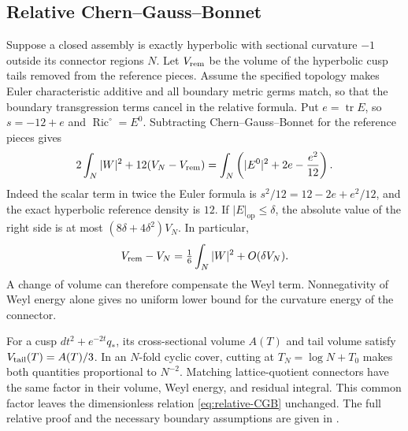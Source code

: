 \documentclass[11pt,a4paper]{article}
\theoremstyle{definition}\newtheorem{definition}[theorem]{Definition}
\theoremstyle{remark}\newtheorem{remark}[theorem]{Remark}
\DeclareMathOperator{\Ric}{Ric}
\DeclareMathOperator{\tr}{tr}
\newcommand{\op}{\mathrm{op}}
\newcommand{\Riczero}{\Ric^{\circ}}
\begin{document}
\subsection{Relative Chern--Gauss--Bonnet}
Suppose a closed assembly is exactly hyperbolic with sectional curvature $-1$ outside its connector regions $N$. Let $V_{\rm rem}$ be the volume of the hyperbolic cusp tails removed from the reference pieces. Assume the specified topology makes Euler characteristic additive and all boundary metric germs match, so that the boundary transgression terms cancel in the relative formula. Put $e=\tr E$, so $s=-12+e$ and $\Riczero=E^0$. Subtracting Chern--Gauss--Bonnet for the reference pieces gives
\begin{equation}\label{eq:relative-CGB}
 2\int_N|W|^2+12(V_N-V_{\rm rem})
 =\int_N\left(|E^0|^2+2e-\frac{e^2}{12}\right).
\end{equation}
Indeed the scalar term in twice the Euler formula is $s^2/12=12-2e+e^2/12$, and the exact hyperbolic reference density is $12$. If $|E|_\op\le\delta$, the absolute value of the right side is at most $(8\delta+4\delta^2)V_N$. In particular,
\begin{equation}\label{eq:relative-volume}
 V_{\rm rem}-V_N=\tfrac16\int_N|W|^2+O(\delta V_N).
\end{equation}
A change of volume can therefore compensate the Weyl term. Nonnegativity of Weyl energy alone gives no uniform lower bound for the curvature energy of the connector.

For a cusp $dt^2+e^{-2t}q_*$, its cross-sectional volume $A(T)$ and tail volume satisfy $V_{\rm tail}(T)=A(T)/3$. In an $N$-fold cyclic cover, cutting at $T_N=\log N+T_0$ makes both quantities proportional to $N^{-2}$. Matching lattice-quotient connectors have the same factor in their volume, Weyl energy, and residual integral. This common factor leaves the dimensionless relation \eqref{eq:relative-CGB} unchanged. The full relative proof and the necessary boundary assumptions are given in \cite{source-connectors}.
\end{document}
